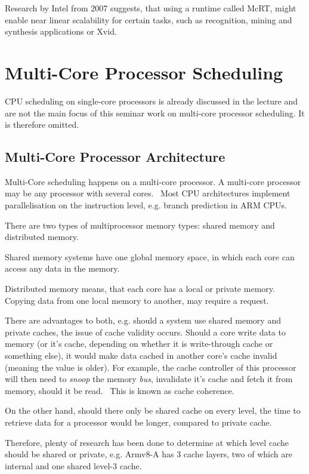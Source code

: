 \documentclass[runningheads]{llncs}
\begin{document}
Research by Intel from 2007 suggests, that using a runtime called McRT, might enable near linear
scalability for certain tasks, such as recognition, mining and synthesis applications or Xvid.~
\cite{scalability-of-programs-multi-cores}

\section{Multi-Core Processor Scheduling}
CPU scheduling on single-core processors is already discussed in the lecture and are not the main focus of this seminar work on multi-core processor scheduling. It is therefore omitted.
\subsection{Multi-Core Processor Architecture}
Multi-Core scheduling happens on a multi-core processor. A multi-core processor may be any processor with several cores.~\cite{multicore-slides}
Most CPU architectures implement parallelisation on the instruction level, e.g. branch prediction
in ARM CPUs.~\cite{arm-docs-branch-prediction} 

There are two types of multiprocessor memory types:
shared memory and distributed memory.

Shared memory systems have one global memory space, in which each core can access any data in the
memory.~\cite{multicore-slides}

Distributed memory means, that each core has a local or private memory. Copying data from one local
memory to another, may require a request.~\cite{multicore-slides}

There are advantages to both, e.g. should a system use shared memory and private caches, the issue
of cache validity occurs. Should a core write data to memory (or it's cache, depending on whether
it is write-through cache or something else), it would make data cached in another core's cache
invalid (meaning the value is older). For example, the cache controller of this processor will then need to 
\textit{snoop} the memory \textit{bus}, invalidate it's cache and fetch it from memory, should it be read.~\cite{ostep} This is known as cache coherence.~\cite{multicore-slides}

On the other hand, should there only be shared cache on every level, the time to retrieve data for a
processor would be longer, compared to private cache. 

Therefore, plenty of research has been done to determine at which level cache should be shared or 
private, e.g. Armv8-A has 3 cache layers, two of which are internal and one shared level-3 cache.~\cite{arm-docs-cache}
\end{document}
